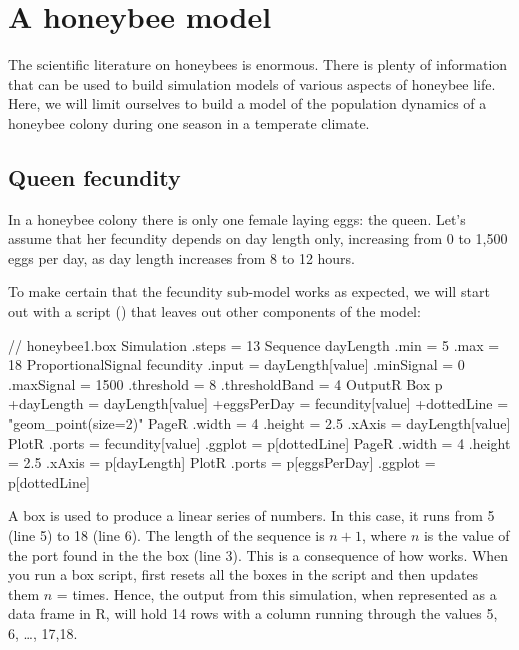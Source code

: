 \FloatBarrier
\section{A honeybee model}
The scientific literature on honeybees is enormous. There is plenty of information that can be used to build simulation models of various aspects of honeybee life. Here, we will limit ourselves to build a model of the population dynamics of a honeybee colony during one season in a temperate climate.

\subsection{Queen fecundity}
In a honeybee colony there is only one female laying eggs: the queen. Let's assume that her fecundity depends on day length only, increasing from 0 to 1,500 eggs per day, as day length increases from 8 to 12 hours.

To make certain that the fecundity sub-model works as expected, we will start out with a  script () that leaves out other components of the model:

\lstset{numbers=left}
\begin{boxscript}
// honeybee1.box
Simulation {
  .steps = 13
  Sequence dayLength {
    .min = 5
    .max = 18
  }
  ProportionalSignal fecundity {
    .input = dayLength[value]
    .minSignal = 0
    .maxSignal = 1500
    .threshold = 8
    .thresholdBand = 4
  }
  OutputR {
    Box p {
      +dayLength  = dayLength[value]
      +eggsPerDay = fecundity[value]
      +dottedLine = "geom_point(size=2)"
    }
    PageR {
      .width = 4
      .height = 2.5
      .xAxis = dayLength[value]
      PlotR {
        .ports = fecundity[value]
        .ggplot = p[dottedLine]
      }
    }
    PageR {
      .width = 4
      .height = 2.5
      .xAxis = p[dayLength]
      PlotR {
        .ports = p[eggsPerDay]
        .ggplot = p[dottedLine]
      }
    }
  }
}
\end{boxscript}
\lstset{numbers=none}

A  box is used to produce a linear series of numbers. In this case, it runs from 5 (line 5) to 18 (line 6). The length of the sequence is $n+1$, where $n$ is the value of the  port found in the the  box (line 3). This is a consequence of how  works. When you run a box script,  first resets all the boxes in the script and then updates them $n$ =  times. Hence, the output from this simulation, when represented as a data frame in R, will hold 14 rows with a  column running through the values 5, 6, \ldots, 17,18. 

